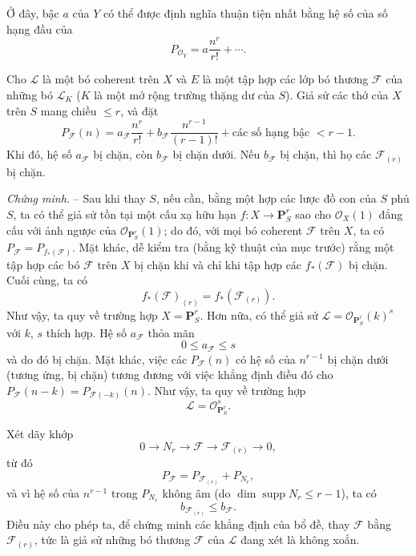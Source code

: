 Ở đây, bậc $a$ của $Y$ có thể được định nghĩa thuận tiện nhất bằng hệ số của
số hạng đầu của
\[
P_{\mathcal O_Y}=a\frac{n^r}{r!}+\cdots.
\]

 Cho $\mathcal L$ là một bó coherent trên $X$ và $E$ là
một tập hợp các lớp bó thương $\mathcal F$ của những bó $\mathcal L_K$ ($K$
là một mở rộng trường thặng dư của $S$). Giả sử các thớ của $X$ trên $S$ mang
chiều $\leq r$, và đặt
\[
P_{\mathcal F}(n)=a_{\mathcal F}\frac{n^r}{r!}
+b_{\mathcal F}\frac{n^{r-1}}{(r-1)!}
+\text{các số hạng bậc $<r-1$}.
\]
Khi đó, hệ số $a_{\mathcal F}$ bị chặn, còn $b_{\mathcal F}$ bị chặn dưới.
Nếu $b_{\mathcal F}$ bị chặn, thì họ các $\mathcal F_{(r)}$ bị chặn.

\emph{Chứng minh.} -- Sau khi thay $S$, nếu cần, bằng một hợp các lược đồ con
của $S$ phủ $S$, ta có thể giả sử tồn tại một cấu xạ hữu hạn
$f:X\longrightarrow\mathbf P^r_S$ sao cho $\mathcal O_X(1)$ đẳng cấu với ảnh
ngược của $\mathcal O_{\mathbf P^r_S}(1)$; do đó, với mọi bó coherent
$\mathcal F$ trên $X$, ta có
$P_{\mathcal F}=P_{f_*(\mathcal F)}$. Mặt khác, dễ kiểm tra (bằng kỹ thuật của
mục trước) rằng một tập hợp các bó $\mathcal F$ trên $X$ bị chặn khi và chỉ khi
tập hợp các $f_*(\mathcal F)$ bị chặn. Cuối cùng, ta có
\[
f_*(\mathcal F)_{(r)}=f_*(\mathcal F_{(r)}).
\]
Như vậy, ta quy về trường hợp $X=\mathbf P^r_S$. Hơn nữa, có thể giả sử
$\mathcal L=\mathcal O_{\mathbf P^r_S}(k)^s$ với $k$, $s$ thích hợp. Hệ số
$a_{\mathcal F}$ thỏa mãn
\[
0\leq a_{\mathcal F}\leq s
\]
và do đó bị chặn. Mặt khác, việc các $P_{\mathcal F}(n)$ có hệ số của
$n^{r-1}$ bị chặn dưới (tương ứng, bị chặn) tương đương với việc khẳng định
điều đó cho
$P_{\mathcal F}(n-k)=P_{\mathcal F(-k)}(n)$. Như vậy, ta quy về trường hợp
\[
\mathcal L=\mathcal O_{\mathbf P^r_S}^{s}.
\]

Xét dãy khớp
\[
0\longrightarrow N_r\longrightarrow\mathcal F
\longrightarrow\mathcal F_{(r)}\longrightarrow0,
\]
từ đó
\[
P_{\mathcal F}=P_{\mathcal F_{(r)}}+P_{N_r},
\]
và vì hệ số của $n^{r-1}$ trong $P_{N_r}$ không âm (do
$\dim\operatorname{supp}N_r\leq r-1$), ta có
\[
b_{\mathcal F_{(r)}}\leq b_{\mathcal F}.
\]
Điều này cho phép ta, để chứng minh các khẳng định của bổ đề, thay
$\mathcal F$ bằng $\mathcal F_{(r)}$, tức là giả sử những bó thương
$\mathcal F$ của $\mathcal L$ đang xét là không xoắn.

